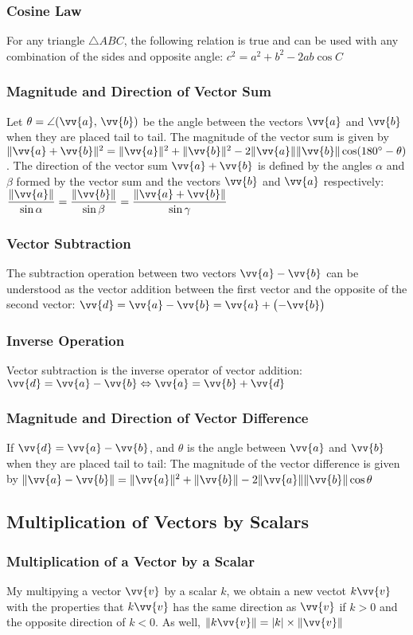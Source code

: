 \documentclass{article}
\newcommand{\mv}[1]{
	\lVert\vv{#1}\rVert
}
\begin{document}
	\subsubsection{Cosine Law}
	For any triangle $\triangle ABC$, the following relation is true and can be used with any combination of the sides and opposite angle: $c^2=a^2+b^2-2ab\cos C$
	\subsubsection{Magnitude and Direction of Vector Sum}
	Let $\theta=\angle (\vv{a},\,\vv{b})$ be the angle between the vectors $\vv{a}$ and $\vv{b}$ when they are placed tail to tail. The magnitude of the vector sum is given by $\lVert\vv{a}+\vv{b}\rVert^2=\mv{a}^2+\mv{b}^2-2\mv{a}\mv{b}\cos(180^\circ-\theta)$. The direction of the vector sum $\vv{a}+\vv{b}$ is defined by the angles $\alpha$ and $\beta$ formed by the vector sum and the vectors $\vv{b}$ and $\vv{a}$ respectively: $\dfrac{\mv{a}}{\sin\alpha}=\dfrac{\mv{b}}{\sin\beta}=\dfrac{\lVert\vv{a}+\vv{b}\rVert}{\sin\gamma}$
	\subsubsection{Vector Subtraction}
	The subtraction operation between two vectors $\vv{a}-\vv{b}$ can be understood as the vector addition between the first vector and the opposite of the second vector: $\vv{d}=\vv{a}-\vv{b}=\vv{a}+\left(-\vv{b}\right)$
	\subsubsection{Inverse Operation}
	Vector subtraction is the inverse operator of vector addition: $\vv{d}=\vv{a}-\vv{b}\Leftrightarrow\vv{a}=\vv{b}+\vv{d}$
	\subsubsection{Magnitude and Direction of Vector Difference}
	If $\vv{d}=\vv{a}-\vv{b}$, and $\theta$ is the angle between $\vv{a}$ and $\vv{b}$ when they are placed tail to tail: %
	The magnitude of the vector difference is given by $\lVert\vv{a}-\vv{b}\rVert=\mv{a}^2+\mv{b}-2\mv{a}\mv{b}\cos\theta$
	\subsection{Multiplication of Vectors by Scalars}
	\subsubsection{Multiplication of a Vector by a Scalar}
	My multipying a vector $\vv{v}$ by a scalar $k$, we obtain a new vectot $k\vv{v}$ with the properties that $k\vv{v}$ has the same direction as $\vv{v}$ if $k>0$ and the opposite direction of $k<0$. As well, $\lVert k\vv{v}\rVert=|k|\times\mv{v}$
\end{document}
